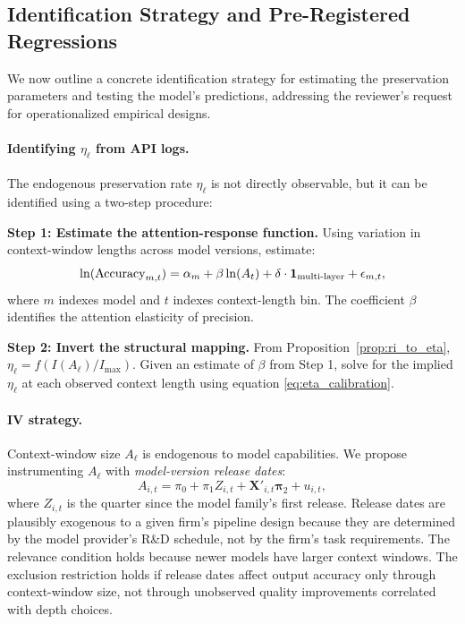 \subsection{Identification Strategy and Pre-Registered Regressions}
\label{subsec:identification}

We now outline a concrete identification strategy for estimating the preservation parameters and testing the model's predictions, addressing the reviewer's request for operationalized empirical designs.

\paragraph{Identifying $\eta_\ell$ from API logs.} The endogenous preservation rate $\eta_\ell$ is not directly observable, but it can be identified using a two-step procedure:

\textbf{Step 1: Estimate the attention-response function.} Using variation in context-window lengths across model versions, estimate:
\begin{equation}\label{eq:first_stage_eta}
\ln(\text{Accuracy}_{m,t}) = \alpha_m + \beta \ln(A_t) + \delta \cdot \mathbf{1}_{\text{multi\text{-}layer}} + \epsilon_{m,t},
\end{equation}
where $m$ indexes model and $t$ indexes context-length bin. The coefficient $\beta$ identifies the attention elasticity of precision.

\textbf{Step 2: Invert the structural mapping.} From Proposition~\ref{prop:ri_to_eta}, $\eta_\ell = f(I(A_\ell) / I_{\max})$. Given an estimate of $\beta$ from Step 1, solve for the implied $\eta_\ell$ at each observed context length using equation \eqref{eq:eta_calibration}.

\paragraph{IV strategy.} Context-window size $A_\ell$ is endogenous to model capabilities. We propose instrumenting $A_\ell$ with \emph{model-version release dates}:
\begin{equation}\label{eq:iv}
A_{i,t} = \pi_0 + \pi_1 Z_{i,t} + \mathbf{X}'_{i,t}\boldsymbol{\pi}_2 + u_{i,t},
\end{equation}
where $Z_{i,t}$ is the quarter since the model family's first release. Release dates are plausibly exogenous to a given firm's pipeline design because they are determined by the model provider's R\&D schedule, not by the firm's task requirements. The relevance condition holds because newer models have larger context windows. The exclusion restriction holds if release dates affect output accuracy only through context-window size, not through unobserved quality improvements correlated with depth choices.

